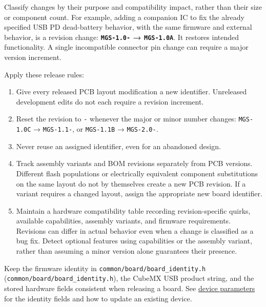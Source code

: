 \documentclass[10pt,a4paper,oneside]{report}
\providecommand{\tightlist}{\setlength{\itemsep}{1pt}\setlength{\parskip}{1pt}}
\begin{document}
Classify changes by their purpose and compatibility impact, rather than their size or component count. For example, adding a companion IC to fix the already specified USB PD dead-battery behavior, with the same firmware and external behavior, is a revision change: \textbf{\texttt{MGS-\allowbreak{}1.\allowbreak{}0-\allowbreak{}} → \texttt{MGS-\allowbreak{}1.\allowbreak{}0A}}. It restores intended functionality. A single incompatible connector pin change can require a major version increment.

Apply these release rules:

\begin{enumerate}
\def\labelenumi{\arabic{enumi}.}
\tightlist
\item
  Give every released PCB layout modification a new identifier. Unreleased development edits do not each require a revision increment.
\item
  Reset the revision to \texttt{-\allowbreak{}} whenever the major or minor number changes: \texttt{MGS-\allowbreak{}1.\allowbreak{}0C} → \texttt{MGS-\allowbreak{}1.\allowbreak{}1-\allowbreak{}}, or \texttt{MGS-\allowbreak{}1.\allowbreak{}1B} → \texttt{MGS-\allowbreak{}2.\allowbreak{}0-\allowbreak{}}.
\item
  Never reuse an assigned identifier, even for an abandoned design.
\item
  Track assembly variants and BOM revisions separately from PCB versions. Different flash populations or electrically equivalent component substitutions on the same layout do not by themselves create a new PCB revision. If a variant requires a changed layout, assign the appropriate new board identifier.
\item
  Maintain a hardware compatibility table recording revision-specific quirks, available capabilities, assembly variants, and firmware requirements. Revisions can differ in actual behavior even when a change is classified as a bug fix. Detect optional features using capabilities or the assembly variant, rather than assuming a minor version alone guarantees their presence.
\end{enumerate}

Keep the firmware identity in {\texttt{common/\allowbreak{}board/\allowbreak{}board\_\allowbreak{}identity.\allowbreak{}h} (\nolinkurl{common/board/board_identity.h})}, the CubeMX USB product string, and the stored hardware fields consistent when releasing a board. See \hyperref[wiki-firmware-parameters--editable-fields]{device parameters} for the identity fields and how to update an existing device.
\end{document}
